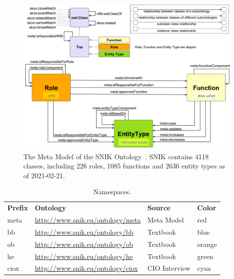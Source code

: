 \documentclass[conference]{IEEEtran}
\begin{document}
\begin{figure}[h]
    \centering
    \includegraphics[width=\linewidth]{metamodel9s.pdf}
    \caption{The Meta Model of the SNIK Ontology~\cite{snikposter}. SNIK contains 4118 classes, including 226 roles, 1085 functions and 2636 entity types as of 2021-02-21.}\label{fig:metamodel}
\end{figure}

\begin{table}[h]
\centering
\caption{Namespaces.}
\label{tab:namespaces}
\begin{tabularx}{\linewidth}{|l|X|l|l|}
\hline
\textbf{Prefix}	&\textbf{Ontology}				&\textbf{Source}		&\textbf{Color}\\
meta	&\url{http://www.snik.eu/ontology/meta}		&Meta Model			&red\\ \hline
bb		&\url{http://www.snik.eu/ontology/bb}		&Textbook~\cite{bb}	&blue\\\hline
ob		&\url{http://www.snik.eu/ontology/ob}		&Textbook~\cite{ob}	&orange\\\hline
he		&\url{http://www.snik.eu/ontology/he}		&Textbook~\cite{he}	&green\\\hline
ciox	&\url{http://www.snik.eu/ontology/ciox}		&CIO Interview		&cyan\\\hline
\end{tabularx}
\end{table}
\end{document}
